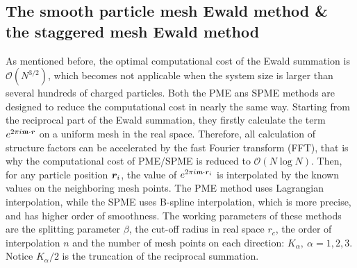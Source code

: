 \documentclass[aps,pre,preprint]{revtex4}
\renewcommand{\v}[1]{\textbf{\textit{#1}}}
\begin{document}
\subsection{The smooth particle mesh Ewald method \&
the staggered mesh Ewald method}


As mentioned before, the 
optimal computational cost of the Ewald summation
is $\mathcal O(N^{3/2})$,
which becomes not applicable when the system
size is larger than several hundreds of charged particles.
Both the PME ans SPME methods
are designed to reduce
the computational cost  in nearly the same
way.
Starting from the reciprocal part of the Ewald summation,
they firstly  calculate the term $e^{2\pi i\v m\cdot\v r}$ on a uniform
mesh in the real space.  Therefore, all calculation of structure factors
can be
accelerated by the fast Fourier transform (FFT), that is why the
computational cost of PME/SPME is reduced to $\mathcal O(N\log N)$. Then,
for any particle position $\v r_i$, the value of $e^{2\pi i\v m\cdot\v
  r_i}$ is interpolated by the known values on the neighboring mesh
points.  The PME method uses Lagrangian interpolation, while the SPME
uses B-spline interpolation,  which is more precise, and has higher order
of smoothness.
The working parameters of these methods are
the splitting parameter $\beta$,
the cut-off radius in real space $r_c$,
the order of interpolation $n$ and
the number of mesh points on each direction:  $K_\alpha,\ \alpha = 1,2,3$.
Notice $K_\alpha/2$ is the truncation
of the reciprocal summation.
\end{document}
